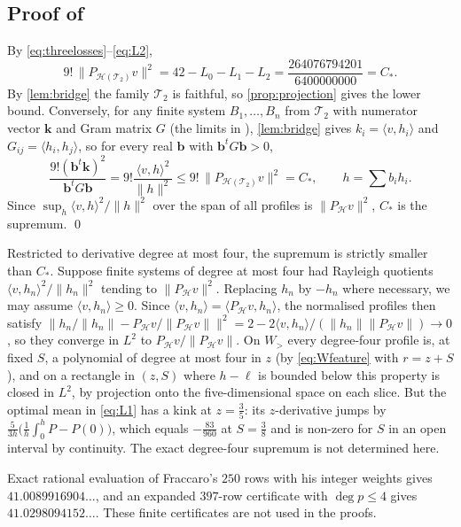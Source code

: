\documentclass[11pt,colorlinks]{charlie}
\newcommand{\ip}[2]{\langle #1,#2\rangle}
\begin{document}
\subsection{Proof of }
By \eqref{eq:threelosses}--\eqref{eq:L2},
\[
 9!\,\|P_{\mathcal H(\mathcal T_2)}v\|^2=42-L_0-L_1-L_2=\frac{264076794201}{6400000000}=C_* .
\]
By \cref{lem:bridge} the family $\mathcal T_2$ is faithful, so \cref{prop:projection} gives the lower bound. Conversely, for any finite system $B_1,\dots,B_n$ from $\mathcal T_2$ with numerator vector $\mathbf k$ and Gram matrix $G$ (the limits in ), \cref{lem:bridge} gives $k_i=\ip v{h_i}$ and $G_{ij}=\ip{h_i}{h_j}$, so for every real $\mathbf b$ with $\mathbf b^tG\mathbf b>0$,
\[
 \frac{9!(\mathbf b^t\mathbf k)^2}{\mathbf b^tG\mathbf b}=9!\frac{\ip{v}{h}^2}{\|h\|^2}\le9!\,\|P_{\mathcal H(\mathcal T_2)}v\|^2=C_*,\qquad h=\sum b_ih_i .
\]
Since $\sup_h\ip vh^2/\|h\|^2$ over the span of all profiles is $\|P_{\mathcal H}v\|^2$, $C_*$ is the supremum. \qed

\begin{remark}\label{rem:degreefour}
Restricted to derivative degree at most four, the supremum is strictly smaller than $C_*$. Suppose finite systems of degree at most four had Rayleigh quotients $\ip v{h_n}^2/\|h_n\|^2$ tending to $\|P_{\mathcal H}v\|^2$. Replacing $h_n$ by $-h_n$ where necessary, we may assume $\ip v{h_n}\ge0$. Since $\ip{v}{h_n}=\ip{P_{\mathcal H}v}{h_n}$, the normalised profiles then satisfy $\|h_n/\|h_n\|-P_{\mathcal H}v/\|P_{\mathcal H}v\|\|^2=2-2\ip v{h_n}/(\|h_n\|\|P_{\mathcal H}v\|)\to0$, so they converge in $L^2$ to $P_{\mathcal H}v/\|P_{\mathcal H}v\|$. On $W_>$ every degree-four profile is, at fixed $S$, a polynomial of degree at most four in $z$ (by \eqref{eq:Wfeature} with $r=z+S$), and on a rectangle in $(z,S)$ where $h-\ell$ is bounded below this property is closed in $L^2$, by projection onto the five-dimensional space on each slice. But the optimal mean in \eqref{eq:L1} has a kink at $z=\frac35$: its $z$-derivative jumps by $\frac5{3h}\big(\frac1h\int_0^hP-P(0)\big)$, which equals $-\frac{83}{960}$ at $S=\frac38$ and is non-zero for $S$ in an open interval by continuity. The exact degree-four supremum is not determined here.
\end{remark}

\begin{remark}
Exact rational evaluation of Fraccaro's $250$ rows with his integer weights gives $41.0089916904\ldots$, and an expanded $397$-row certificate with $\deg p\le4$ gives $41.0298094152\ldots$. These finite certificates are not used in the proofs.
\end{remark}
\end{document}
